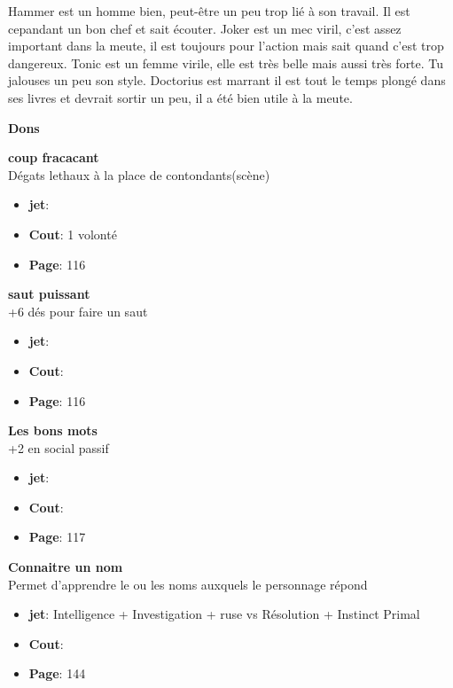 \documentclass[oneside,12pt]{book}
\newcommand\don[5]{
\textbf{#1} \\
#2
\begin{itemize}
\item{ \textbf{jet}: #3}
\item{ \textbf{Cout}: #4}
\item{ \textbf{Page}: #5}
\end{itemize}
\vspace{0.5cm}
}
\begin{document}
\begin{flushleft}
\begin{description}
{Hammer est un homme bien, peut-être un peu trop lié à son travail. Il est cepandant un bon chef et sait écouter.
Joker est un mec viril, c'est assez important dans la meute, il est toujours pour l'action mais sait quand c'est trop dangereux.
Tonic est un femme virile, elle est très belle mais aussi très forte. Tu jalouses un peu son style.
Doctorius est marrant il est tout le temps plongé dans ses livres et devrait sortir un peu, il a été bien utile à la meute.
}
\end{description}
\clearpage
\textbf{\large Dons} 
\vspace{0.5cm}

\don{coup fracacant}{Dégats lethaux à la place de contondants(scène)}{}{1 volonté}{116}
\don{saut puissant}{+6 dés pour faire un saut}{}{}{116}
\don{Les bons mots}{+2 en social passif}{}{}{117}
\don{Connaitre un nom}{Permet d'apprendre le ou les noms auxquels  le personnage répond}{Intelligence + Investigation + ruse vs Résolution + Instinct Primal}{}{144}


\clearpage

\end{flushleft}
\end{document}
